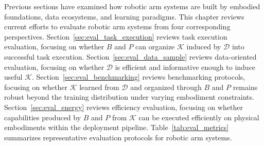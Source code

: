 \documentclass[acmsmall,screen,review]{acmart}
\begin{document}
Previous sections have examined how robotic arm systems are built by embodied foundations, data ecosystems, and learning paradigms. 
This chapter reviews current efforts to evaluate robotic arm systems from four corresponding perspectives.
Section~\ref{sec:eval_task_execution} reviews task execution evaluation, focusing on whether \(B\) and \(P\) can organize \(\mathcal{K}\) induced by \(\mathcal{D}\) into successful task execution.
Section~\ref{sec:eval_data_sample} reviews data-oriented evaluation, focusing on whether \(\mathcal{D}\) is efficient and informative enough to induce useful \(\mathcal{K}\).
Section~\ref{sec:eval_benchmarking} reviews benchmarking protocols, focusing on whether \(\mathcal{K}\) learned from \(\mathcal{D}\) and organized through \(B\) and \(P\) remains robust beyond the training distribution under varying embodiment constraints.
Section~\ref{sec:eval_energy} reviews efficiency evaluation, focusing on whether capabilities produced by \(B\) and \(P\) from \(\mathcal{K}\) can be executed efficiently on physical embodiments within the deployment pipeline.
Table~\ref{tab:eval_metrics} summarizes representative evaluation protocols for robotic arm systems.
\end{document}
